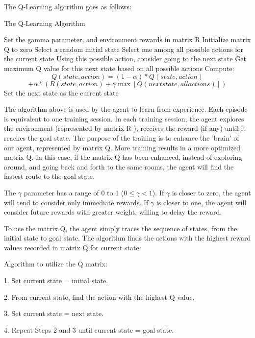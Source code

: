 \documentclass[a4paper, 11pt]{article}
\begin{document}
The Q-Learning algorithm goes as follows:


  \begin{algorithm} 
%    
     \caption{The Q-Learning Algorithm} 
       Set the gamma parameter, and environment rewards in matrix R\;
        Initialize matrix Q to zero\;        
        { 
            Select a random initial state\;
            { 
                Select one among all possible actions for the current state\;
				Using this possible action, consider going to the next state\;
				Get maximum Q value for this next state based on all possible actions\;
				Compute: $$Q(state,action)=(1-\alpha)*Q(state,action)$$
				$$+\alpha*(R(state,action)+\gamma\max[Q(next state,allactions)])$$\;
				Set the next state as the current state\;
            }             
        } 
        
    \end{algorithm}

The algorithm above is used by the agent to learn from experience.  Each episode is equivalent to one training session.  In each training session, the agent explores the environment (represented by matrix R ), receives the reward (if any) until it reaches the goal state. The purpose of the training is to enhance the 'brain' of our agent, represented by matrix Q.  More training results in a more optimized matrix Q.  In this case, if the matrix Q has been enhanced, instead of exploring around, and going back and forth to the same rooms, the agent will find the fastest route to the goal state.

The $\gamma$ parameter has a range of 0 to 1 ($0\leq\gamma<1$).  If $\gamma$ is closer to zero, the agent will tend to consider only immediate rewards.  If $\gamma$ is closer to one, the agent will consider future rewards with greater weight, willing to delay the reward.

To use the matrix Q, the agent simply traces the sequence of states, from the initial state to goal state.  The algorithm finds the actions with the highest reward values recorded in matrix Q for current state:

Algorithm to utilize the Q matrix:

1. Set current state = initial state.

2. From current state, find the action with the highest Q value.

3. Set current state = next state.

4. Repeat Steps 2 and 3 until current state = goal state.
\end{document}
